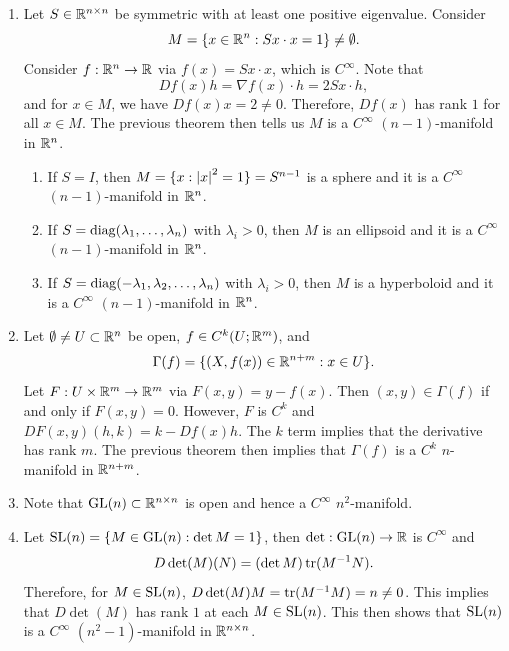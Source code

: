 \documentclass[a4paper]{article}
\begin{document}
\begin{eg}
  \begin{enumerate}
    \item Let $S \in \mathbb{R}^{n \times n}$ be symmetric with at least one
          positive eigenvalue. Consider
          \[
            M = \{x \in \mathbb{R}^n :
            S x \cdot x = 1\} \neq \emptyset.
          \]
          Consider $f : \mathbb{R}^n \to \mathbb{R}$ via $f(x) = Sx \cdot x$, which is
          $C^\infty$. Note that
          \[
            Df(x) h = \nabla f(x) \cdot h = 2Sx \cdot h,
          \]
          and for $x \in M$, we have $Df(x) x = 2 \neq 0$. Therefore,
          $Df(x)$ has rank $1$ for all $x \in M$. The previous theorem
          then tells us $M$ is a $C^\infty$ $(n-1)$-manifold in $\mathbb{R}^n$.

          \begin{enumerate}
            \item If $S = I$, then $M = \{x : \left\lvert x\right\rvert^2 = 1\} = S^{n-1}$
                  is a sphere and it is a $C^\infty$ $(n-1)$-manifold in
                  $\mathbb{R}^n$.

            \item If $S = \operatorname{diag}(\lambda_1, \dots, \lambda_n)$ with
                  $\lambda_i > 0$, then $M$ is an ellipsoid and it is a
                  $C^\infty$ $(n-1)$-manifold in $\mathbb{R}^n$.

            \item If $S = \operatorname{diag}(-\lambda_1, \lambda_2, \dots, \lambda_n)$
                  with $\lambda_i > 0$, then $M$ is a hyperboloid and it
                  is a $C^\infty$ $(n-1)$-manifold in $\mathbb{R}^n$.
          \end{enumerate}

    \item Let $\emptyset \neq U \subset \mathbb{R}^n$ be open, $f \in C^k(U;
          \mathbb{R}^m)$, and
          \[
            \Gamma(f) = \{(X, f(x)) \in \mathbb{R}^{n+m} : x \in U\}.
          \]
          Let $F : U \times \mathbb{R}^m \to \mathbb{R}^m$ via $F(x, y) = y - f(x)$. Then
          $(x, y) \in \Gamma(f)$ if and only if $F(x, y) = 0$. However,
          $F$ is $C^k$ and $DF(x, y) (h, k) = k - Df(x) h$. The $k$ term
          implies that the derivative has rank $m$. The previous theorem
          then implies that $\Gamma(f)$ is a $C^k$ $n$-manifold in
          $\mathbb{R}^{n+m}$.

    \item Note that $\mathrm{GL}(n) \subset \mathbb{R}^{n \times n}$ is open and hence a
          $C^\infty$ $n^2$-manifold.

    \item Let $\mathrm{SL}(n) = \{M \in \mathrm{GL}(n) : \det M = 1\}$, then $\det: \mathrm{GL}(n)
          \to \mathbb{R}$ is $C^\infty$ and
          \[
            D \det(M) (N) = (\det M) \operatorname{tr}(M^{-1} N).
          \]
          Therefore, for $M \in \mathrm{SL}(n)$, $D \det(M) M = \operatorname{tr}(M^{-1} M) = n
          \neq 0$. This implies that $D \det(M)$ has rank $1$ at each $M
          \in \mathrm{SL}(n)$. This then shows that $\mathrm{SL}(n)$ is a $C^\infty$ $(n^2
          - 1)$-manifold in $\mathbb{R}^{n \times n}$.


\end{enumerate}
\end{eg}
\end{document}
